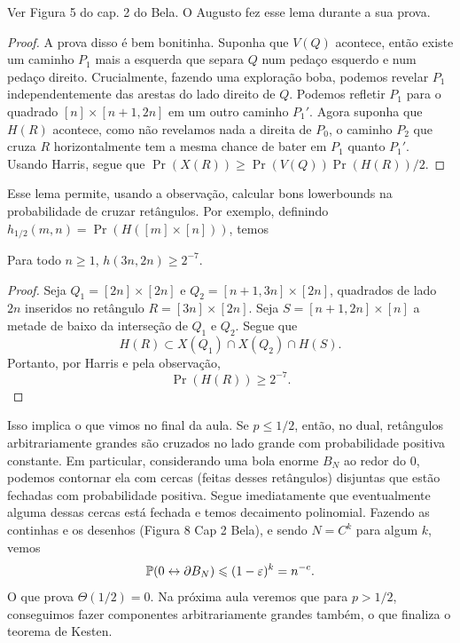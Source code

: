 \begin{remark}
	Ver Figura 5 do cap. 2 do Bela. O Augusto fez esse lema durante a sua prova.
\end{remark}

\begin{proof}
	A prova disso é bem bonitinha. Suponha que $V(Q)$ acontece, então
	existe um caminho $P_1$ mais
	a esquerda que separa $Q$ num pedaço esquerdo e num pedaço direito.
	Crucialmente, fazendo
	uma exploração boba, podemos revelar $P_1$ independentemente das
	arestas do lado direito
	de $Q$. Podemos refletir $P_1$ para o quadrado $[n]\times [n+1,2n]$
	em um outro caminho $P_1'$.
	Agora suponha que $H(R)$ acontece, como não revelamos nada a direita
	de $P_0$, o caminho
	$P_2$ que cruza $R$ horizontalmente tem a mesma chance de bater em
	$P_1$ quanto $P_1'$. Usando
	Harris, segue que $\Pr(X(R)) \geq \Pr(V(Q))\Pr(H(R))/2$.
\end{proof}

Esse lema permite, usando a observação, calcular bons lowerbounds na
probabilidade de cruzar
retângulos. Por exemplo, definindo $h_{1/2}(m,n) = \Pr(H([m] \times
[n]))$, temos

\begin{corollary}
	Para todo $n \geq 1$, $h(3n,2n) \geq 2^{-7}$.
\end{corollary}
\begin{proof}
	Seja $Q_1 = [2n]\times[2n]$ e $Q_2 = [n + 1, 3n] \times [2n]$,
	quadrados de lado $2n$
	inseridos no retângulo $R = [3n]\times[2n]$. Seja $S = [n+1,2n]
	\times [n]$ a metade de
	baixo da interseção de $Q_1$ e $Q_2$. Segue que
	\[
		H(R) \subset X(Q_1) \cap X(Q_2) \cap H(S).
	\]
	Portanto, por Harris e pela observação,
	\[
		\Pr(H(R)) \geq 2^{-7}.
	\]
\end{proof}

Isso implica o que vimos no final da aula. Se $p \leq 1/2$, então, no
dual, retângulos arbitrariamente
grandes são  cruzados no lado grande com probabilidade positiva
constante. Em particular,
considerando uma bola enorme $B_N$ ao redor do $0$, podemos contornar
ela com cercas (feitas desses
retângulos) disjuntas que estão fechadas com probabilidade positiva.
Segue imediatamente que
eventualmente alguma dessas cercas está fechada e temos decaimento
polinomial. Fazendo
as continhas e os desenhos (Figura 8 Cap 2 Bela), e sendo $N = C^k$
para algum $k$, vemos
\[
	\mathbb{P}(0 \leftrightarrow \partial B_{N}) \leqslant (1-\varepsilon)^k = n^{-c}.
\]
O que prova $\Theta(1/2) = 0$. Na próxima aula veremos que para $p >
1/2$, conseguimos
fazer componentes arbitrariamente grandes também, o que finaliza o
teorema de Kesten.
